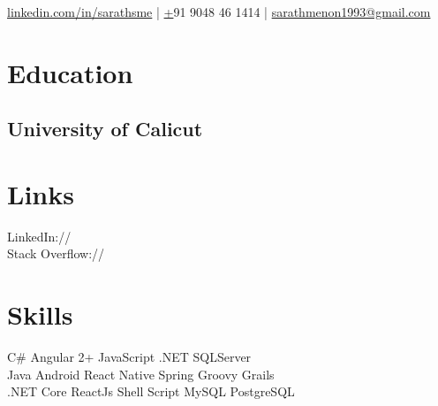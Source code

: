 \documentclass[]{deedy-resume-openfont}
\begin{document}
%
%
\lastupdated

%
%


{
    \href{https://www.linkedin.com/in/sarathsme}{linkedin.com/in/sarathsme} | 
    \href{tel:+919048461414} +91 9048 46 1414 | 
    \href{mailto:sarathmenon1993@gmail.com}{sarathmenon1993@gmail.com}
}

%
%

\begin{minipage}[t]{0.33\textwidth} 


\section{Education} 

\subsection{University of Calicut}
\sectionsep


\section{Links}
LinkedIn://  \href{https://www.linkedin.com/in/sarathsme}{} \\
Stack Overflow://  \href{https://stackoverflow.com/users/6498687/sarath-s-menon}{}
\sectionsep


\section{Skills}
C\# \textbullet{} Angular 2+ \textbullet{} JavaScript \textbullet{} .NET \textbullet{} SQLServer \\ 
Java \textbullet{} Android \textbullet{} React Native  \textbullet{} Spring \textbullet{} Groovy \textbullet{} Grails \\
.NET Core \textbullet{} ReactJs \textbullet{} Shell Script \textbullet{} MySQL \textbullet{} PostgreSQL \\
\sectionsep


\end{minipage}
\end{document}
